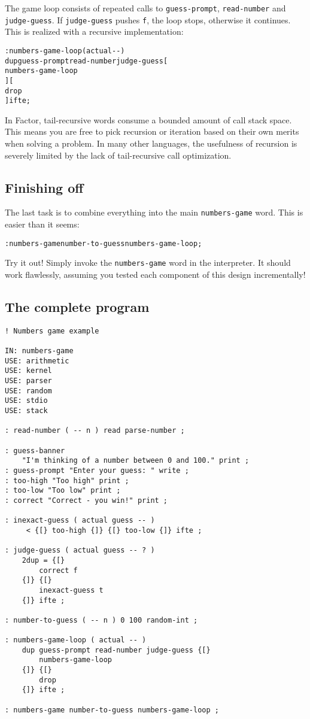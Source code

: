 \documentclass[english]{article}
\begin{document}
The game loop consists of repeated calls to \texttt{guess-prompt},
\texttt{read-number} and \texttt{judge-guess}. If \texttt{judge-guess}
pushes \texttt{f}, the loop stops, otherwise it continues. This is
realized with a recursive implementation:

\begin{alltt}
: numbers-game-loop ( actual -{}- )
    dup guess-prompt read-number judge-guess {[}
        numbers-game-loop
    {]} {[}
        drop
    {]} ifte ;
\end{alltt}
In Factor, tail-recursive words consume a bounded amount of call stack
space. This means you are free to pick recursion or iteration based
on their own merits when solving a problem. In many other languages,
the usefulness of recursion is severely limited by the lack of tail-recursive
call optimization.


\subsection{Finishing off}

The last task is to combine everything into the main \texttt{numbers-game}
word. This is easier than it seems:

\begin{alltt}
: numbers-game number-to-guess numbers-game-loop ;
\end{alltt}
Try it out! Simply invoke the \texttt{numbers-game} word in the interpreter.
It should work flawlessly, assuming you tested each component of this
design incrementally!


\subsection{The complete program}

\begin{verbatim}
! Numbers game example

IN: numbers-game
USE: arithmetic
USE: kernel
USE: parser
USE: random
USE: stdio
USE: stack

: read-number ( -- n ) read parse-number ;

: guess-banner
    "I'm thinking of a number between 0 and 100." print ;
: guess-prompt "Enter your guess: " write ;
: too-high "Too high" print ;
: too-low "Too low" print ;
: correct "Correct - you win!" print ;

: inexact-guess ( actual guess -- )
     < {[} too-high {]} {[} too-low {]} ifte ;

: judge-guess ( actual guess -- ? )
    2dup = {[}
        correct f
    {]} {[}
        inexact-guess t
    {]} ifte ;

: number-to-guess ( -- n ) 0 100 random-int ;

: numbers-game-loop ( actual -- )
    dup guess-prompt read-number judge-guess {[}
        numbers-game-loop
    {]} {[}
        drop
    {]} ifte ;

: numbers-game number-to-guess numbers-game-loop ;
\end{verbatim}
\end{document}
